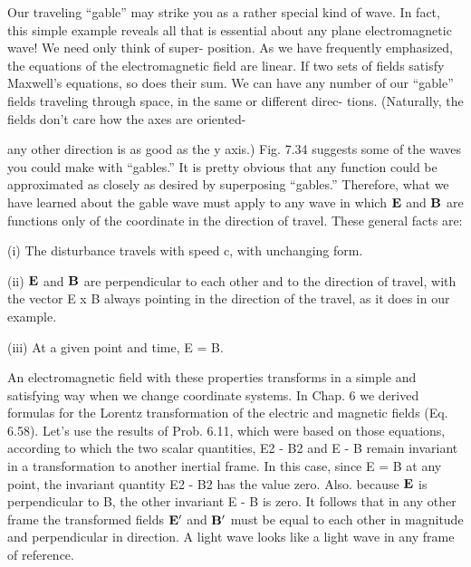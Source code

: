 Our traveling ``gable'' may strike you as a rather special kind of
wave. In fact, this simple example reveals all that is essential about
any plane electromagnetic wave! We need only think of super-
position. As we have frequently emphasized, the equations of the
electromagnetic field are linear. If two sets of fields satisfy Maxwell's
equations, so does their sum. We can have any number of our
``gable'' fields traveling through space, in the same or different direc-
tions. (Naturally, the fields don't care how the axes are oriented-

any other direction is as good as the y axis.) Fig. 7.34 suggests some
of the waves you could make with ``gables.'' It is pretty obvious that
any function could be approximated as closely as desired by superposing
``gables.'' Therefore, what we have learned about the gable
wave must apply to any wave in which $\mathbf{E}$ and $\mathbf{B}$ are functions only
of the coordinate in the direction of travel. These general facts are:

(i) The disturbance travels with speed c, with unchanging
form. 

(ii) $\mathbf{E}$ and $\mathbf{B}$ are perpendicular to each other and to the direction
of travel, with the vector E x B always pointing in the
direction of the travel, as it does in our example.

(iii) At a given point and time, E = B.

An electromagnetic field with these properties transforms in a
simple and satisfying way when we change coordinate systems. In
Chap. 6 we derived formulas for the Lorentz transformation of the
electric and magnetic fields (Eq. 6.58). Let's use the results of
Prob. 6.11, which were based on those equations, according to which
the two scalar quantities, E2 - B2 and E - B remain invariant in a
transformation to another inertial frame. In this case, since E = B
at any point, the invariant quantity E2 - B2 has the value zero. Also.
because $\mathbf{E}$ is perpendicular to B, the other invariant E - B is zero. It
follows that in any other frame the transformed fields $\mathbf{E}'$ and $\mathbf{B}'$ must
be equal to each other in magnitude and perpendicular in direction.
A light wave looks like a light wave in any frame of reference.

\fi

